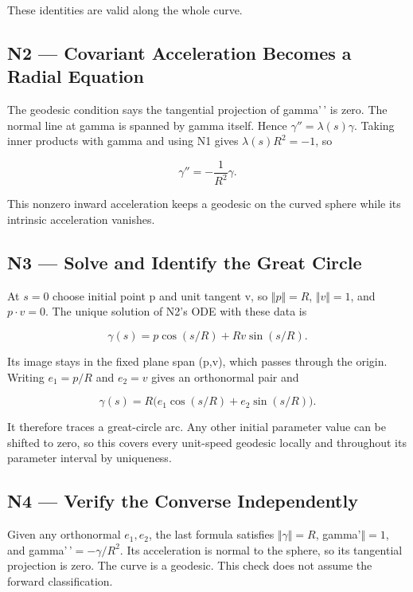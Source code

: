 \documentclass[preprint,12pt,aps,pra,showkeys,amsmath,amssymb,superscriptaddress,floatfix]{revtex4-2}
\theoremstyle{definition}
\theoremstyle{remark}
\begin{document}
These identities are valid along the whole curve.

\subsection{N2 --- Covariant Acceleration Becomes a Radial
Equation}\label{n2-covariant-acceleration-becomes-a-radial-equation}

The geodesic condition says the tangential projection of gamma'\,' is
zero. The normal line at gamma is spanned by gamma itself. Hence
\(\gamma''=\lambda(s)\gamma\). Taking inner products with gamma and
using N1 gives \(\lambda(s)R^2=-1\), so

\[\gamma''=-\frac1{R^2}\gamma.\]

This nonzero inward acceleration keeps a geodesic on the curved sphere
while its intrinsic acceleration vanishes.

\subsection{N3 --- Solve and Identify the Great
Circle}\label{n3-solve-and-identify-the-great-circle}

At \(s=0\) choose initial point p and unit tangent v, so
\(\Vert p\Vert =R\), \(\Vert v\Vert =1\), and \(p\cdot v=0\). The unique
solution of N2's ODE with these data is

\[\gamma(s)=p\cos(s/R)+Rv\sin(s/R).\]

Its image stays in the fixed plane span (p,v), which passes through the
origin. Writing \(e_{1}=p/R\) and \(e_{2}=v\) gives an orthonormal pair
and

\[\gamma(s)=R\big(e_1\cos(s/R)+e_2\sin(s/R)\big).\]

It therefore traces a great-circle arc. Any other initial parameter
value can be shifted to zero, so this covers every unit-speed geodesic
locally and throughout its parameter interval by uniqueness.

\subsection{N4 --- Verify the Converse
Independently}\label{n4-verify-the-converse-independently}

Given any orthonormal \(e_{1},e_{2}\), the last formula satisfies
\(\Vert \gamma \Vert =R\), \textbar\textbar gamma'\(\Vert =1\), and
gamma'\,'\(=-\gamma /R^{2}\). Its acceleration is normal to the sphere,
so its tangential projection is zero. The curve is a geodesic. This
check does not assume the forward classification.
\end{document}
